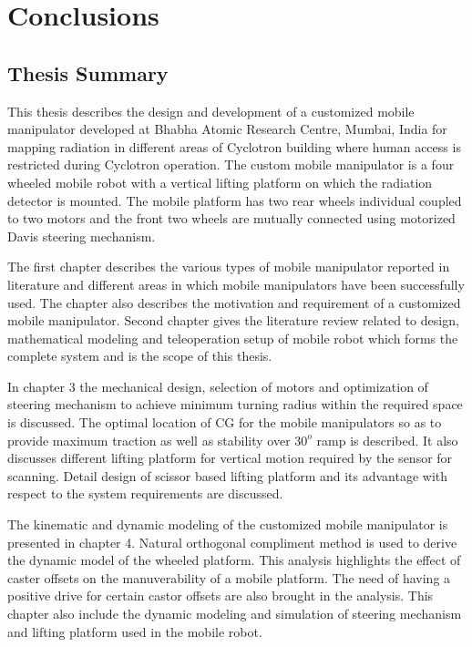 \chapter{Conclusions}
\section{Thesis Summary}
This thesis describes the design and development of a customized mobile manipulator developed at Bhabha Atomic Research Centre, Mumbai, India  for mapping radiation in different areas of Cyclotron building where human access is restricted during Cyclotron operation. The custom mobile manipulator is a four wheeled mobile robot with a vertical lifting platform on which the radiation detector is mounted. The mobile platform has two rear wheels individual coupled to   two motors and the front two wheels are mutually connected using motorized Davis steering mechanism.

   The first chapter describes the various types of mobile manipulator reported in literature and different areas in which mobile manipulators have been successfully used. The chapter also describes the motivation and requirement of a customized mobile manipulator.  Second chapter gives the literature review related to design, mathematical modeling and teleoperation setup of mobile robot which forms the complete system and is  the scope of this thesis. 

In chapter 3 the mechanical design, selection of motors and optimization  of steering mechanism to achieve minimum turning radius within the required space is discussed. The optimal location of CG for  the mobile manipulators so as to provide maximum traction as well as  stability over $30^o$ ramp is described.   It also discusses different lifting platform for vertical motion required by the sensor for scanning. Detail design  of scissor based lifting platform and its advantage with respect to the system requirements are discussed. 

The kinematic and dynamic modeling of the customized mobile manipulator is presented in chapter 4.  Natural orthogonal compliment method is used to derive the dynamic model of the wheeled platform. This analysis highlights the  effect of caster  offsets on the manuverability of a mobile platform. The need of having a positive drive for certain castor offsets are also brought in the analysis. This chapter also include the dynamic modeling and simulation of steering mechanism  and lifting platform used in the mobile robot.     


